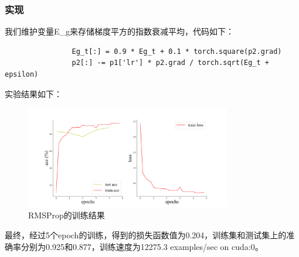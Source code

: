 \documentclass[10.5pt,a4paper]{article}%
\begin{document}
            \subsubsection{实现}
            我们维护变量E\_g来存储梯度平方的指数衰减平均，代码如下：
            \begin{lstlisting}
                Eg_t[:] = 0.9 * Eg_t + 0.1 * torch.square(p2.grad)
                p2[:] -= p1['lr'] * p2.grad / torch.sqrt(Eg_t + epsilon)
            \end{lstlisting}\par
            实验结果如下：
            \begin{figure}[H]
            \centering
                \includegraphics[width=0.8\textwidth]{imgs_5e/RMSProp.png}
              \caption{RMSProp的训练结果}
              \label{fig:rmsprop}
            \end{figure} 
            最终，经过5个epoch的训练，得到的损失函数值为0.204，训练集和测试集上的准确率分别为0.925和0.877，训练速度为12275.3 examples/sec on cuda:0。\par
\end{document}
